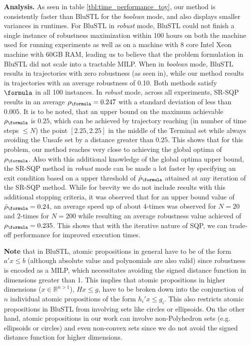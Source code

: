 \textbf{Analysis.}
As seen in table \ref{tbl:time_performance_toy}, our method is consistently faster than BluSTL for the \textit{boolean} mode, and also displays smaller variances in runtimes. For BluSTL in \textit{robust} mode, BluSTL could not finish a single instance of robustness maximization within 100 hours on both the machine used for running experiments as well as on a machine with 8 core Intel Xeon machine with 60GB RAM, leading us to believe that the problem formulation in BluSTL did not scale into a tractable MILP.
When in \textit{boolean} mode, BluSTL results in trajectories with zero robustness (as seen in), while our method results in trajectories with an average robustness of 0.10. Both methods satisfy $\formula$ in all 100 instances. In \textit{robust} mode, across all experiments, SR-SQP results in an average $\rob_{\formula}=0.247$ with a standard deviation of less than $0.005$. It is to be noted, that an upper bound on the maximum achievable $\rob_{\formula}$ is $0.25$, which can be achieved by trajectory reaching (in number of time steps $\leq N$) the point $[2.25,2.25]$ in the middle of the Terminal set while always avoiding the Unsafe set by a distance greater than $0.25$. This shows that for this problem, our method reaches very close to achieving the global optima of $\rob_{\formula}$. Also with this additional knowledge of the global optima upper bound, the SR-SQP method in \textit{robust} mode can be made a lot faster by specifying an exit condition based on a upper threshold of $\srob_{\formula}$ attained at any iteration of the SR-SQP method. While for brevity we do not include results with this additional stopping criteria, it was observed that for an upper bound value of $\srob_{\formula}=0.24$, an average speed up of about $4$-times was observed for $N=20$ and $2$-times for $N=200$ while resulting an average robustness value achieved of $\rob_{\formula} = 0.235$. This shows that with the iterative nature of SQP, we can trade-off performance for improved execution times.

\textbf{Note} that in BluSTL, atomic propositions in general have to be of the form $a'x\leq b$ (although absolute value and polynomials are also valid) since robustness is encoded as a MILP, which necessitates avoiding the signed distance function in dimensions greater than 1. This implies that atomic propositions in higher dimensions ($x\in \mathbb{R}^{n>1}$), $Hx \leq g$, have to be broken down into the conjunction of $n$ individual atomic propositions of the form $h_i'x \leq g_i$. This also restricts atomic propositions in BluSTL from involving sets like circles or ellipsoids. On the other hand, atomic propositions in our work can involve non-Polyhedron sets (e.g. ellipsoids or circles) and even non-convex sets since we do not avoid the signed distance function for higher dimensions.

